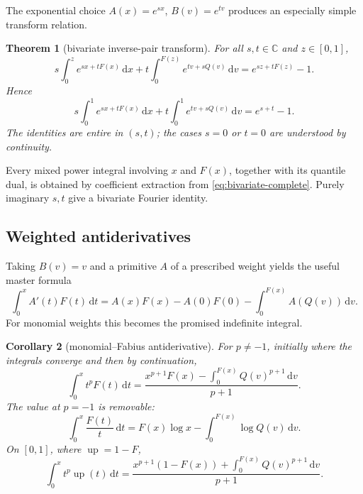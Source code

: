 \documentclass[11pt,oneside]{article}
\newtheorem{theorem}{Theorem}[section]
\newtheorem{corollary}[theorem]{Corollary}
\theoremstyle{definition}
\newcommand{\F}{F}
\newcommand{\Q}{Q}
\newcommand{\upf}{\operatorname{up}}
\newcommand{\C}{\mathbb C}
\newcommand{\dd}{\,\mathrm d}
\begin{document}
The exponential choice \(A(x)=e^{sx}\), \(B(v)=e^{tv}\) produces an especially
simple transform relation.

\begin{theorem}[bivariate inverse-pair transform]\label{thm:bivariate-exp}
For all \(s,t\in\C\) and \(z\in[0,1]\),
\begin{equation}\label{eq:bivariate-incomplete}
 s\int_0^z e^{sx+t\F(x)}\dd x
 +t\int_0^{\F(z)}e^{tv+s\Q(v)}\dd v
 =e^{sz+t\F(z)}-1.
\end{equation}
Hence
\begin{equation}\label{eq:bivariate-complete}
 s\int_0^1e^{sx+t\F(x)}\dd x
 +t\int_0^1e^{tv+s\Q(v)}\dd v
 =e^{s+t}-1.
\end{equation}
The identities are entire in \((s,t)\); the cases \(s=0\) or \(t=0\) are understood
by continuity.
\end{theorem}

Every mixed power integral involving \(x\) and \(\F(x)\), together with its quantile
dual, is obtained by coefficient extraction from \cref{eq:bivariate-complete}.  Purely
imaginary \(s,t\) give a bivariate Fourier identity.

\subsection{Weighted antiderivatives}

Taking \(B(v)=v\) and a primitive \(A\) of a prescribed weight yields the useful
master formula
\begin{equation}\label{eq:weighted-antiderivative-master}
 \int_0^x A'(t)\F(t)\dd t
 =A(x)\F(x)-A(0)\F(0)-\int_0^{\F(x)}A(\Q(v))\dd v.
\end{equation}
For monomial weights this becomes the promised indefinite integral.

\begin{corollary}[monomial--Fabius antiderivative]\label{cor:monomial-F}
For \(p\ne-1\), initially where the integrals converge and then by continuation,
\begin{equation}\label{eq:monomial-F-antiderivative}
 \int_0^x t^p\F(t)\dd t
 =\frac{x^{p+1}\F(x)-\displaystyle\int_0^{\F(x)}\Q(v)^{p+1}\dd v}{p+1}.
\end{equation}
The value at \(p=-1\) is removable:
\begin{equation}\label{eq:F-over-x-incomplete}
 \int_0^x\frac{\F(t)}t\dd t
 =\F(x)\log x-\int_0^{\F(x)}\log\Q(v)\dd v.
\end{equation}
On \([0,1]\), where \(\upf=1-\F\),
\begin{equation}\label{eq:monomial-up-half-antiderivative}
 \int_0^x t^p\upf(t)\dd t
 =\frac{x^{p+1}(1-\F(x))+\displaystyle\int_0^{\F(x)}\Q(v)^{p+1}\dd v}{p+1}.
\end{equation}
\end{corollary}
\end{document}
